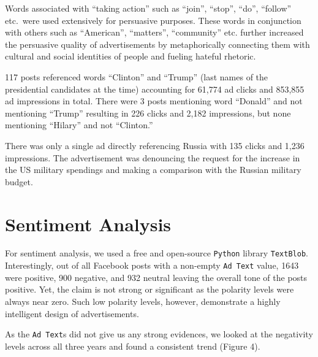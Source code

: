 \documentclass{article}
\begin{document}
\medskip

Words associated with ``taking action'' such as ``join'', ``stop'', ``do'',
``follow'' etc.~were used extensively for persuasive purposes. These words in
conjunction with others such as ``American'', ``matters'', ``community'' etc.
further increased the persuasive quality of advertisements by metaphorically
connecting them with cultural and social identities of people and fueling
hateful rhetoric.

\medskip

117 posts referenced words ``Clinton'' and ``Trump'' (last names of the
presidential candidates at the time) accounting for 61,774 ad clicks and
853,855 ad impressions in total. There were 3 posts mentioning word ``Donald''
and not mentioning ``Trump'' resulting in 226 clicks and 2,182 impressions, but
none mentioning ``Hilary'' and not ``Clinton.''

\medskip

There was only a single ad directly referencing Russia with 135 clicks and
1,236 impressions. The advertisement was denouncing the request for the
increase in the US military spendings and making a comparison with the Russian
military budget.


\section{Sentiment Analysis}

For sentiment analysis, we used a free and open-source \texttt{Python} library
\texttt{TextBlob}. Interestingly, out of all Facebook posts with a non-empty
\texttt{Ad Text} value, 1643 were positive, 900 negative, and 932 neutral
leaving the overall tone of the posts positive. Yet, the claim is not strong
or significant as the polarity levels were always near zero. Such low polarity
levels, however, demonstrate a highly intelligent design of advertisements.

\medskip

As the \texttt{Ad Text}s did not give us any strong evidences, we looked at the
negativity levels across all three years and found a consistent trend (Figure 4).
\end{document}
